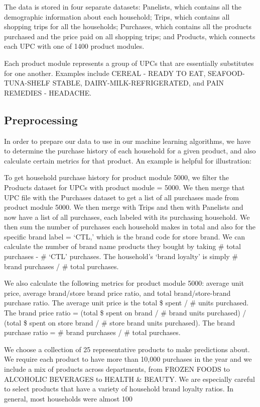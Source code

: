\documentclass[conference]{IEEEtran}
\begin{document}
The data is stored in four separate datasets: Panelists, which contains all the demographic information about each household; Trips, which contains all shopping trips for all the households; Purchases, which contains all the products purchased and the price paid on all shopping trips; and Products, which connects each UPC with one of 1400 product modules.


Each product module represents a group of UPCs that are essentially substitutes for one another. Examples include CEREAL - READY TO EAT, SEAFOOD-TUNA-SHELF STABLE, DAIRY-MILK-REFRIGERATED, and PAIN REMEDIES - HEADACHE.

\subsection{Preprocessing}
In order to prepare our data to use in our machine learning algorithms, we have to determine the purchase history of each household for a given product, and also calculate certain metrics for that product. An example is helpful for illustration: 

To get household purchase history for product module 5000, we filter the Products dataset for UPCs with product module = 5000. We then merge that UPC file with the Purchases dataset to get a list of all purchases made from product module 5000. We then merge with Trips and then with Panelists and now have a list of all purchases, each labeled with its purchasing household. We then sum the number of purchases each household makes in total and also for the specific brand label = ‘CTL,’ which is the brand code for store brand. We can calculate the number of brand name products they bought by taking \# total purchases - \# ‘CTL’ purchases. The household’s ‘brand loyalty’ is simply \# brand purchases / \# total purchases. 


We also calculate the following metrics for product module 5000: average unit price, average brand/store brand price ratio, and total brand/store-brand purchase ratio. The average unit price is the total \$ spent / \# units purchased. The brand price ratio = (total \$ spent on brand / \# brand units purchased) / (total \$ spent on store brand / \# store brand units purchased). The brand purchase ratio = \# brand purchases / \# total purchases.

We choose a collection of 25 representative products to make predictions about. We require each product to have more than 10,000 purchases in the year and we include a mix of products across departments, from FROZEN FOODS to ALCOHOLIC BEVERAGES to HEALTH \& BEAUTY. We are especially careful to select products that have a variety of household brand loyalty ratios. In general, most households were almost 100%
\end{document}
